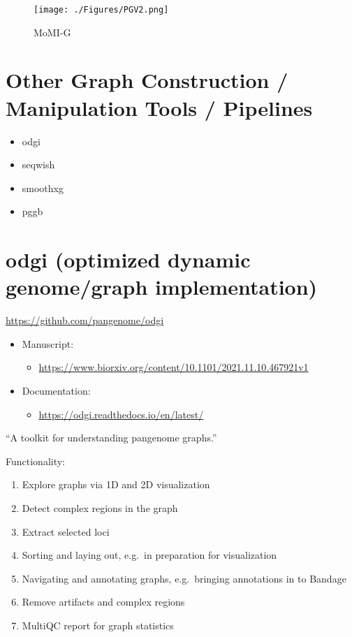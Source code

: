 \documentclass[
]{book}
\providecommand{\tightlist}{%
  \setlength{\itemsep}{0pt}\setlength{\parskip}{0pt}}
\begin{document}
\begin{figure}
\centering
\texttt{[image: ./Figures/PGV2.png]}
\caption{MoMI-G}
\end{figure}

\hypertarget{other-graph-construction-manipulation-tools-pipelines}{%
\section{Other Graph Construction / Manipulation Tools / Pipelines}\label{other-graph-construction-manipulation-tools-pipelines}}

\begin{itemize}
\tightlist
\item
  odgi
\item
  seqwish
\item
  smoothxg
\item
  pggb
\end{itemize}

\hypertarget{odgi-optimized-dynamic-genomegraph-implementation}{%
\section{odgi (optimized dynamic genome/graph implementation)}\label{odgi-optimized-dynamic-genomegraph-implementation}}

\url{https://github.com/pangenome/odgi}

\begin{itemize}
\tightlist
\item
  Manuscript:

  \begin{itemize}
  \tightlist
  \item
    \url{https://www.biorxiv.org/content/10.1101/2021.11.10.467921v1}
  \end{itemize}
\item
  Documentation:

  \begin{itemize}
  \tightlist
  \item
    \url{https://odgi.readthedocs.io/en/latest/}
  \end{itemize}
\end{itemize}

``A toolkit for understanding pangenome graphs.''

Functionality:

\begin{enumerate}
\def\labelenumi{\arabic{enumi}.}
\tightlist
\item
  Explore graphs via 1D and 2D visualization
\item
  Detect complex regions in the graph
\item
  Extract selected loci
\item
  Sorting and laying out, e.g.~in preparation for visualization
\item
  Navigating and annotating graphs, e.g.~bringing annotations in
  to Bandage
\item
  Remove artifacts and complex regions
\item
  MultiQC report for graph statistics
\end{enumerate}
\end{document}
